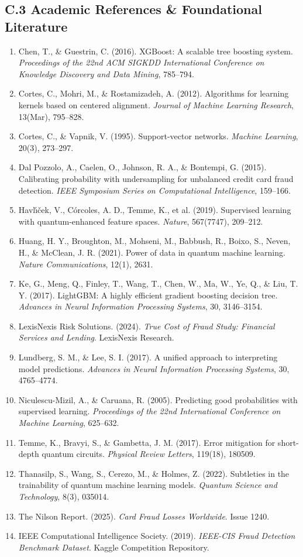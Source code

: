 \documentclass[10pt,a4paper]{article}
\begin{document}
\subsection*{C.3 Academic References \& Foundational Literature}
\begin{enumerate}[leftmargin=*,itemsep=0.5pt,topsep=1pt]
\footnotesize
\item Chen, T., \& Guestrin, C. (2016). XGBoost: A scalable tree boosting system. \textit{Proceedings of the 22nd ACM SIGKDD International Conference on Knowledge Discovery and Data Mining}, 785--794.
\item Cortes, C., Mohri, M., \& Rostamizadeh, A. (2012). Algorithms for learning kernels based on centered alignment. \textit{Journal of Machine Learning Research}, 13(Mar), 795--828.
\item Cortes, C., \& Vapnik, V. (1995). Support-vector networks. \textit{Machine Learning}, 20(3), 273--297.
\item Dal Pozzolo, A., Caelen, O., Johnson, R. A., \& Bontempi, G. (2015). Calibrating probability with undersampling for unbalanced credit card fraud detection. \textit{IEEE Symposium Series on Computational Intelligence}, 159--166.
\item Havl{\'\i}{\v{c}}ek, V., C{\'o}rcoles, A. D., Temme, K., et al. (2019). Supervised learning with quantum-enhanced feature spaces. \textit{Nature}, 567(7747), 209--212.
\item Huang, H. Y., Broughton, M., Mohseni, M., Babbush, R., Boixo, S., Neven, H., \& McClean, J. R. (2021). Power of data in quantum machine learning. \textit{Nature Communications}, 12(1), 2631.
\item Ke, G., Meng, Q., Finley, T., Wang, T., Chen, W., Ma, W., Ye, Q., \& Liu, T. Y. (2017). LightGBM: A highly efficient gradient boosting decision tree. \textit{Advances in Neural Information Processing Systems}, 30, 3146--3154.
\item LexisNexis Risk Solutions. (2024). \textit{True Cost of Fraud Study: Financial Services and Lending}. LexisNexis Research.
\item Lundberg, S. M., \& Lee, S. I. (2017). A unified approach to interpreting model predictions. \textit{Advances in Neural Information Processing Systems}, 30, 4765--4774.
\item Niculescu-Mizil, A., \& Caruana, R. (2005). Predicting good probabilities with supervised learning. \textit{Proceedings of the 22nd International Conference on Machine Learning}, 625--632.
\item Temme, K., Bravyi, S., \& Gambetta, J. M. (2017). Error mitigation for short-depth quantum circuits. \textit{Physical Review Letters}, 119(18), 180509.
\item Thanasilp, S., Wang, S., Cerezo, M., \& Holmes, Z. (2022). Subtleties in the trainability of quantum machine learning models. \textit{Quantum Science and Technology}, 8(3), 035014.
\item The Nilson Report. (2025). \textit{Card Fraud Losses Worldwide}. Issue 1240.
\item IEEE Computational Intelligence Society. (2019). \textit{IEEE-CIS Fraud Detection Benchmark Dataset}. Kaggle Competition Repository.
\end{enumerate}
\end{document}
